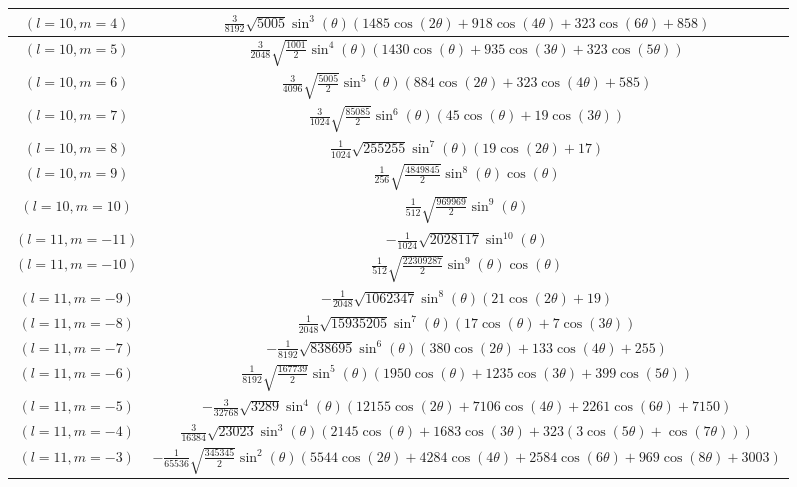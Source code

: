 \begin{center}
\begin{longtable}{|c|c|}
$(l=10, m=4)$ & $\frac{3}{8192} \sqrt{5005} \sin ^3(\theta ) (1485 \cos (2 \theta )+918 \cos (4 \theta )+323 \cos (6 \theta )+858)$ \\ \hline
\rowcolor{gray!15}
$(l=10, m=5)$ & $\frac{3}{2048} \sqrt{\frac{1001}{2}} \sin ^4(\theta ) (1430 \cos (\theta )+935 \cos (3 \theta )+323 \cos (5 \theta ))$ \\ \hline
$(l=10, m=6)$ & $\frac{3}{4096} \sqrt{\frac{5005}{2}} \sin ^5(\theta ) (884 \cos (2 \theta )+323 \cos (4 \theta )+585)$ \\ \hline
\rowcolor{gray!15}
$(l=10, m=7)$ & $\frac{3}{1024} \sqrt{\frac{85085}{2}} \sin ^6(\theta ) (45 \cos (\theta )+19 \cos (3 \theta ))$ \\ \hline
$(l=10, m=8)$ & $\frac{1}{1024} \sqrt{255255} \sin ^7(\theta ) (19 \cos (2 \theta )+17)$ \\ \hline
\rowcolor{gray!15}
$(l=10, m=9)$ & $\frac{1}{256} \sqrt{\frac{4849845}{2}} \sin ^8(\theta ) \cos (\theta )$ \\ \hline
$(l=10, m=10)$ & $\frac{1}{512} \sqrt{\frac{969969}{2}} \sin ^9(\theta )$ \\ \hline
\rowcolor{gray!15}
$(l=11, m=-11)$ & $-\frac{1}{1024} \sqrt{2028117} \sin ^{10}(\theta )$ \\ \hline
$(l=11, m=-10)$ & $\frac{1}{512} \sqrt{\frac{22309287}{2}} \sin ^9(\theta ) \cos (\theta )$ \\ \hline
\rowcolor{gray!15}
$(l=11, m=-9)$ & $-\frac{1}{2048} \sqrt{1062347} \sin ^8(\theta ) (21 \cos (2 \theta )+19)$ \\ \hline
$(l=11, m=-8)$ & $\frac{1}{2048} \sqrt{15935205} \sin ^7(\theta ) (17 \cos (\theta )+7 \cos (3 \theta ))$ \\ \hline
\rowcolor{gray!15}
$(l=11, m=-7)$ & $-\frac{1}{8192} \sqrt{838695} \sin ^6(\theta ) (380 \cos (2 \theta )+133 \cos (4 \theta )+255)$ \\ \hline
$(l=11, m=-6)$ & $\frac{1}{8192} \sqrt{\frac{167739}{2}} \sin ^5(\theta ) (1950 \cos (\theta )+1235 \cos (3 \theta )+399 \cos (5 \theta ))$ \\ \hline
\rowcolor{gray!15}
$(l=11, m=-5)$ & $-\frac{3}{32768} \sqrt{3289} \sin ^4(\theta ) (12155 \cos (2 \theta )+7106 \cos (4 \theta )+2261 \cos (6 \theta )+7150)$ \\ \hline
$(l=11, m=-4)$ & $\frac{3}{16384} \sqrt{23023} \sin ^3(\theta ) (2145 \cos (\theta )+1683 \cos (3 \theta )+323 (3 \cos (5 \theta )+\cos (7 \theta )))$ \\ \hline
\rowcolor{gray!15}
$(l=11, m=-3)$ & $-\frac{1}{65536} \sqrt{\frac{345345}{2}} \sin ^2(\theta ) (5544 \cos (2 \theta )+4284 \cos (4 \theta )+2584 \cos (6 \theta )+969 \cos (8 \theta )+3003)$ \\ \hline

\end{longtable}
\end{center}
